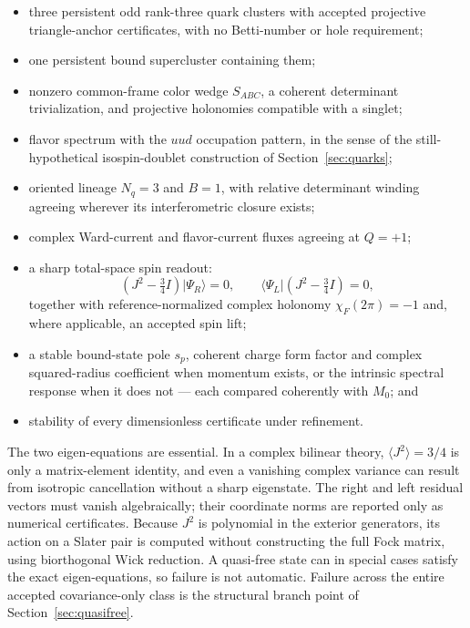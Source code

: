 \documentclass[11pt,letterpaper]{article}
\begin{document}
\begin{itemize}
  \item three persistent odd rank-three quark clusters with accepted
    projective triangle-anchor certificates, with no Betti-number or hole
    requirement;
  \item one persistent bound supercluster containing them;
  \item nonzero common-frame color wedge $S_{ABC}$, a coherent determinant
    trivialization, and projective holonomies compatible with a singlet;
  \item flavor spectrum with the $uud$ occupation pattern, in the sense of
    the still-hypothetical isospin-doublet construction of
    Section~\ref{sec:quarks};
  \item oriented lineage $N_q=3$ and $B=1$, with relative determinant winding
    agreeing wherever its interferometric closure exists;
  \item complex Ward-current and flavor-current fluxes agreeing at $Q=+1$;
  \item a sharp total-space spin readout:
    \begin{equation*}
      (J^2-\tfrac34 I)\lvert\Psi_R\rangle=0,\qquad
      \langle\Psi_L\rvert(J^2-\tfrac34 I)=0,
    \end{equation*}
    together with reference-normalized complex holonomy
    $\chi_F(2\pi)=-1$ and, where applicable, an accepted spin lift;
  \item a stable bound-state pole $s_p$, coherent charge form factor and
    complex squared-radius coefficient when momentum exists, or the intrinsic
    spectral response when it does not --- each compared coherently with
    $M_0$; and
  \item stability of every dimensionless certificate under refinement.
\end{itemize}

The two eigen-equations are essential. In a complex bilinear theory,
$\langle J^2\rangle=3/4$ is only a matrix-element identity, and even a vanishing
complex variance can result from isotropic cancellation without a sharp
eigenstate. The right and left residual vectors must vanish algebraically;
their coordinate norms are reported only as numerical certificates. Because
$J^2$ is polynomial in the exterior generators, its action on a Slater pair is
computed without constructing the full Fock matrix, using biorthogonal Wick
reduction. A quasi-free state can in special cases satisfy the exact
eigen-equations, so failure is not automatic. Failure across the entire
accepted covariance-only class is the structural branch point of
Section~\ref{sec:quasifree}.
\end{document}
